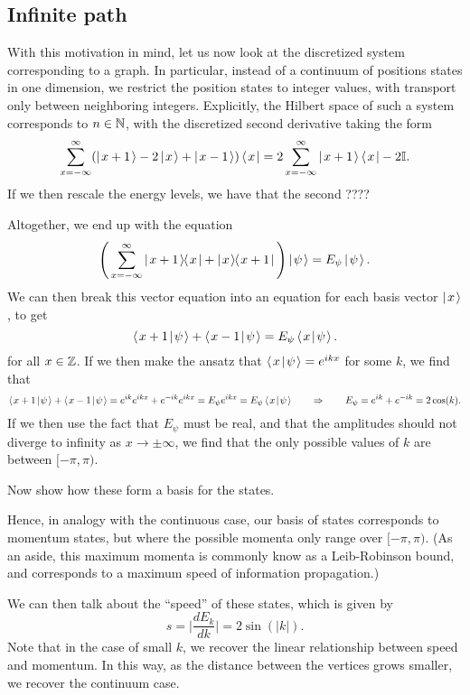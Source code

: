 \documentclass[../thesis-main/thesis-main]{subfiles}
\begin{document}
\subsection{Infinite path}

With this motivation in mind, let us now look at the discretized system corresponding to a graph.  In particular, instead of a continuum of positions states in one dimension, we restrict the position states to integer values, with transport only between neighboring integers.  Explicitly, the Hilbert space of such a system corresponds to $n\in \mathbb{N}$, with the discretized second derivative taking the form
\[
  \sum_{x=-\infty}^\infty (\left|\mspace{2mu} x + 1 \mspace{2mu} \right\rangle - 2\left|\mspace{2mu} x \mspace{2mu} \right\rangle + \left|\mspace{2mu} x-1 \mspace{2mu} \right\rangle) \left\langle\mspace{2mu} x \mspace{2mu} \right| = 2\sum_{x=-\infty}^\infty \left|\mspace{2mu} x+1 \mspace{2mu} \right\rangle \left\langle\mspace{2mu} x \mspace{2mu} \right| - 2 \mathbb{I}.
\]
If we then rescale the energy levels, we have that the second ????

Altogether, we end up with the equation
\begin{equation}
  \Bigg(\sum_{x=-\infty}^\infty \left|\mspace{2mu} x+1\mspace{2mu} \middle\rangle\mspace{-2mu} \middle\langle\mspace{2mu} x\mspace{2mu}\right| + \left|\mspace{2mu} x\mspace{2mu} \middle\rangle\mspace{-2mu} \middle\langle\mspace{2mu} x+1\mspace{2mu}\right| \Bigg) \left|\mspace{2mu} \psi \mspace{2mu} \right\rangle = E_\psi \left|\mspace{2mu} \psi \mspace{2mu} \right\rangle.
\end{equation}
We can then break this vector equation into an equation for each basis vector $\left|\mspace{2mu} x \mspace{2mu} \right\rangle$, to get
\begin{equation}
  \left\langle\mspace{2mu} x+1\mspace{2mu} \middle|\mspace{2mu} \psi\mspace{2mu} \right\rangle + \left\langle\mspace{2mu} x-1\mspace{2mu} \middle|\mspace{2mu} \psi\mspace{2mu} \right\rangle = E_\psi \left\langle\mspace{2mu} x\mspace{2mu} \middle|\mspace{2mu} \psi\mspace{2mu} \right\rangle.
\end{equation}
for all $x\in \mathbb{Z}$.  If we then make the ansatz that $\left\langle\mspace{2mu} x\mspace{2mu} \middle|\mspace{2mu} \psi\mspace{2mu} \right\rangle = e^{i k x}$ for some $k$, we find that
\begin{equation}
  \left\langle\mspace{2mu} x+1\mspace{2mu} \middle|\mspace{2mu} \psi\mspace{2mu} \right\rangle + \left\langle\mspace{2mu} x-1\mspace{2mu} \middle|\mspace{2mu} \psi\mspace{2mu} \right\rangle = e^{i k } e^{i k x} + e^{-ik} e^{ikx} = E_\psi e^{ik x} = E_\psi \left\langle\mspace{2mu} x\mspace{2mu} \middle|\mspace{2mu} \psi\mspace{2mu} \right\rangle \qquad \Rightarrow \qquad E_\psi = e^{ik} + e^{-i k} = 2 \cos(k).
\end{equation}
If we then use the fact that $E_\psi$ must be real, and that the amplitudes should not diverge to infinity as $x\rightarrow \pm \infty$, we find that the only possible values of $k$ are between $[-\pi,\pi)$.  

Now show how these form a basis for the states.

Hence, in analogy with the continuous case, our basis of states corresponds to momentum states, but where the possible momenta only range over $[-\pi,\pi)$.  (As an aside, this maximum momenta is commonly know as a Leib-Robinson bound, and corresponds to a maximum speed of information propagation.)

We can then talk about the ``speed'' of these states, which is given by
\begin{equation}
  s = \Big| \frac{d E_k}{d k} \Big| = 2 \sin (|k|).
\end{equation}
Note that in the case of small $k$, we recover the linear relationship between speed and momentum.  In this way, as the distance between the vertices grows smaller, we recover the continuum case.
\end{document}
